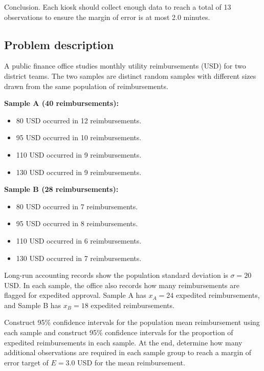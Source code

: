 \begin{ExamProblems}
		Conclusion. Each kiosk should collect enough data to reach a total of 13 observations to ensure the margin of error is at most 2.0 minutes.

		\newpage
		\item
		\subsection*{Problem description}
		A public finance office studies monthly utility reimbursements (USD) for two district teams.
		The two samples are distinct random samples with different sizes drawn from the same population of reimbursements.

		\textbf{Sample A (40 reimbursements):}
		\begin{itemize}
			\item 80 USD occurred in 12 reimbursements.
			\item 95 USD occurred in 10 reimbursements.
			\item 110 USD occurred in 9 reimbursements.
			\item 130 USD occurred in 9 reimbursements.
		\end{itemize}

		\textbf{Sample B (28 reimbursements):}
		\begin{itemize}
			\item 80 USD occurred in 7 reimbursements.
			\item 95 USD occurred in 8 reimbursements.
			\item 110 USD occurred in 6 reimbursements.
			\item 130 USD occurred in 7 reimbursements.
		\end{itemize}

		Long-run accounting records show the population standard deviation is $\sigma = 20$ USD.
		In each sample, the office also records how many reimbursements are flagged for expedited approval.
		Sample A has $x_A = 24$ expedited reimbursements, and Sample B has $x_B = 18$ expedited reimbursements.

		Construct 95\% confidence intervals for the population mean reimbursement using each sample and construct 95\% confidence intervals for the proportion of expedited reimbursements in each sample.
		At the end, determine how many additional observations are required in each sample group to reach a margin of error target of $E = 3.0$ USD for the mean reimbursement.


\end{ExamProblems}
